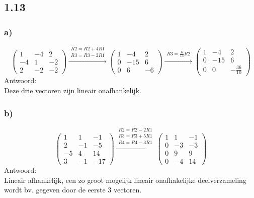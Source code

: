 \documentclass[11pt]{article}
\begin{document}
\subsection*{1.13}
\subsubsection*{a)}
\[
\begin{pmatrix}
  1 & -4 & 2 \\
  -4 & 1 & -2 \\
  2 & -2 & -2 
 \end{pmatrix}
 \overset{\begin{matrix}
  R2 = R2+4R1 \\
  R3 = R3-2R1
 \end{matrix}}{\rightarrow}
 \begin{pmatrix}
  1 & -4 & 2 \\
  0 & -15 & 6 \\
  0 & 6 & -6 
 \end{pmatrix}
 \overset{\begin{matrix}
  R3 = \frac{6}{15}R2
 \end{matrix}}{\rightarrow}
 \begin{pmatrix}
  1 & -4 & 2 \\
  0 & -15 & 6 \\
  0 & 0 & -\frac{36}{10} 
 \end{pmatrix}
\]
Antwoord:\\
Deze drie vectoren zijn lineair onafhankelijk.

\subsubsection*{b)}
\[
 \begin{pmatrix}
  1 & 1 & -1 \\
  2 & -1 & -5 \\
  -5 & 4 & 14 \\
  3 & -1 & -17 
 \end{pmatrix}
 \overset{\begin{matrix}
  R2 = R2-2R1\\
  R3 = R3+5R1\\
  R4 = R4-3R1
 \end{matrix}}{\rightarrow}
 \begin{pmatrix}
  1 & 1 & -1 \\
  0 & -3 & -3 \\
  0 & 9 & 9 \\
  0 & -4 & 14 
 \end{pmatrix}
\]
Antwoord:\\
Lineair afhankelijk, een zo groot mogelijk lineair onafhakelijke deelverzameling wordt bv. gegeven door de eerste 3 vectoren.
\end{document}
